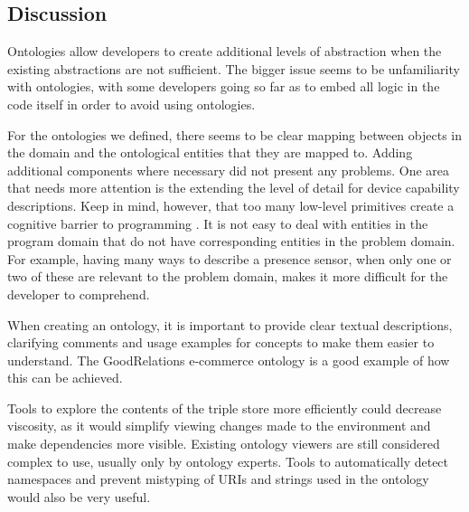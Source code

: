 
\subsection{Discussion}


Ontologies allow developers to create additional levels of abstraction when the existing abstractions are not sufficient. The bigger issue seems to be unfamiliarity with ontologies, with some developers going so far as to embed all logic in the code itself in order to avoid using ontologies.

For the ontologies we defined, there seems to be clear mapping between objects in the domain and the ontological entities that they are mapped to. Adding additional components where necessary did not present any problems. One area that needs more attention is the extending the level of detail for device capability descriptions. Keep in mind, however, that too many low-level primitives create a cognitive barrier to programming \cite{Green1996}. It is not easy to deal with entities in the program domain that do not have corresponding entities in the problem domain. For example, having many ways to describe a presence sensor, when only one or two of these are relevant to the problem domain, makes it more difficult for the developer to comprehend.

When creating an ontology, it is important to provide clear textual descriptions, clarifying comments and usage examples for concepts to make them easier to understand. The GoodRelations e-commerce ontology is a good example of how this can be achieved.

Tools to explore the contents of the triple store more efficiently could decrease viscosity, as it would simplify viewing changes made to the environment and make dependencies more visible. Existing ontology viewers are still considered complex to use, usually only by ontology experts. Tools to automatically detect namespaces and prevent mistyping of \acp{URI} and strings used in the ontology would also be very useful.

